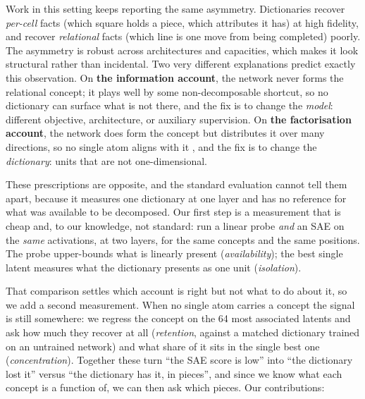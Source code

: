 \documentclass{article}
\begin{document}
Work in this setting keeps reporting the same asymmetry. Dictionaries recover
\emph{per-cell} facts (which square holds a piece, which attributes it
has) at high fidelity, and recover \emph{relational} facts (which line is one
move from being completed) poorly. The asymmetry is robust across
architectures and capacities, which makes it look structural rather than
incidental. Two very different explanations predict exactly this observation.
On \textbf{the information account}, the network never forms the relational
concept; it plays well by some non-decomposable shortcut, so no dictionary can
surface what is not there, and the fix is to change the \emph{model}: different
objective, architecture, or auxiliary supervision. On \textbf{the factorisation
  account}, the network does form the concept but distributes it over many
directions, so no single atom aligns with it
\citep{engels2024notall,park2024geometry}, and the fix is to change the
\emph{dictionary}: units that are not one-dimensional.

These prescriptions are opposite, and the standard evaluation cannot tell them
apart, because it measures one dictionary at one layer and has no reference for
what was available to be decomposed. Our first step is a measurement that is
cheap and, to our knowledge, not standard: run a linear probe \emph{and} an
SAE on the \emph{same} activations, at two layers, for the same concepts and the
same positions. The probe upper-bounds what is linearly present
(\emph{availability}); the best single latent measures what the dictionary
presents as one unit (\emph{isolation}).

That comparison settles which account is right but not what to do about it, so
we add a second measurement. When no single atom carries a concept the signal is
still somewhere: we regress the concept on the 64 most associated latents and
ask how much they recover at all (\emph{retention}, against a matched dictionary
trained on an untrained network) and what share of it sits in the single best
one (\emph{concentration}). Together these turn ``the SAE score is low'' into
``the dictionary lost it'' versus ``the dictionary has it, in pieces'', and
since we know what each concept is a function of, we can then ask which pieces.
Our contributions:
\end{document}
